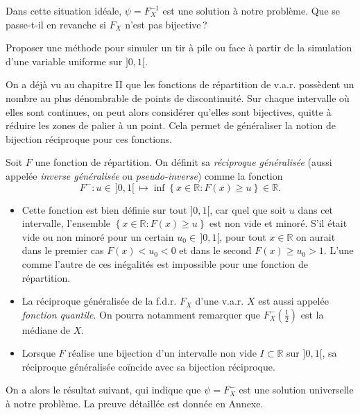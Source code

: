 
Dans cette situation idéale, \(\psi = F_X^{-1}\) est une solution à
notre problème. Que se passe-t-il en revanche si \(F_X\) n'est pas
bijective\,?

\label{V-pf}
Proposer une méthode pour simuler un tir à pile ou face à partir de la
simulation d'une variable uniforme sur \(]0,1[\).

On a déjà vu au chapitre II que les fonctions de répartition de v.a.r.
possèdent un nombre au plus dénombrable de points de discontinuité. Sur
chaque intervalle où elles sont continues, on peut alors considérer
qu'elles sont bijectives, quitte à réduire les zones de palier à un
point. Cela permet de généraliser la notion de bijection réciproque pour
ces fonctions.

\begin{definition}\label{V-defrecgen}

Soit \(F\) une fonction de répartition. On définit sa \emph{réciproque
généralisée} (aussi appelée \emph{inverse généralisée} ou
\emph{pseudo-inverse}) comme la fonction
\[F^{-} : u \in\, ]0,1[\, \mapsto \inf\left\{ x \in \mathbb{R}: F(x) \geq u \right\} \in \mathbb{R}.\]
\end{definition}

\begin{remarque}[{Conséquences}]\label{V-consuxe9quences}

\begin{itemize}
\tightlist
\item
  Cette fonction est bien définie sur tout \(]0,1[\), car quel que soit
  \(u\) dans cet intervalle, l'ensemble
  \(\left\{ x \in \mathbb{R}: F(x) \geq u \right\}\) est non vide et
  minoré. S'il était vide ou non minoré pour un certain
  \(u_0\in\,]0,1[\), pour tout \(x \in \mathbb{R}\) on aurait dans le
  premier cas \(F(x) < u_0 < 0\) et dans le second
  \(F(x) \geq u_0 > 1\). L'une comme l'autre de ces inégalités est
  impossible pour une fonction de répartition.
\item
  La réciproque généralisée de la f.d.r. \(F_X\) d'une v.a.r. \(X\) est
  aussi appelée \emph{fonction quantile}. On pourra notamment remarquer
  que \(F_X^{-}\left(\frac{1}{2}\right)\) est la médiane de \(X\).
\item
  Lorsque \(F\) réalise une bijection d'un intervalle non vide
  \(I\subset \mathbb{R}\) sur \(]0,1[\), sa réciproque généralisée
  coïncide avec sa bijection réciproque.
\end{itemize}

On a alors le résultat suivant, qui indique que \(\psi = F_X^-\) est une
solution universelle à notre problème. La preuve détaillée est donnée en
Annexe.
\end{remarque}

